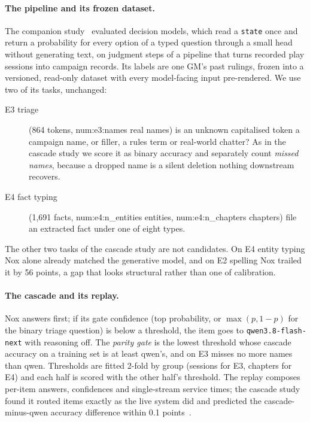 \documentclass[11pt]{article}
\newcommand{\N}[1]{\csname num:#1\endcsname}
\begin{document}
\paragraph{The pipeline and its frozen dataset.} The companion study~\cite{companion} evaluated
decision models, which read a \texttt{state} once and return a probability for every option of a
typed question through a small head without generating text, on judgment steps of a pipeline that
turns recorded play sessions into campaign records. Its labels are one GM's past rulings, frozen
into a versioned, read-only dataset with every model-facing input pre-rendered. We use two of its
tasks, unchanged:
\begin{description}
  \item[E3 triage] (864 tokens, \N{e3:names} real names) is an unknown capitalised token a campaign
        name, or filler, a rules term or real-world chatter? As in the cascade study we score it as
        binary accuracy and separately count \emph{missed names}, because a dropped name is a silent
        deletion nothing downstream recovers.
  \item[E4 fact typing] (1{,}691 facts, \N{e4:n_entities} entities, \N{e4:n_chapters} chapters) file
        an extracted fact under one of eight types.
\end{description}
The other two tasks of the cascade study are not candidates. On E4 entity typing Nox alone already
matched the generative model, and on E2 spelling Nox trailed it by 56 points, a gap that looks
structural rather than one of calibration.

\paragraph{The cascade and its replay.} Nox answers first; if its gate confidence (top probability,
or $\max(p, 1-p)$ for the binary triage question) is below a threshold, the item goes to
\texttt{qwen3.8-flash-next} with reasoning off. The \emph{parity gate} is the lowest threshold whose
cascade accuracy on a training set is at least qwen's, and on E3 misses no more names than qwen.
Thresholds are fitted 2-fold by group (sessions for E3, chapters for E4) and each half is scored with
the other half's threshold. The replay composes per-item answers, confidences and single-stream
service times; the cascade study found it routed items exactly as the live system did and predicted
the cascade-minus-qwen accuracy difference within 0.1 points~\cite{cascade}.
\end{document}

